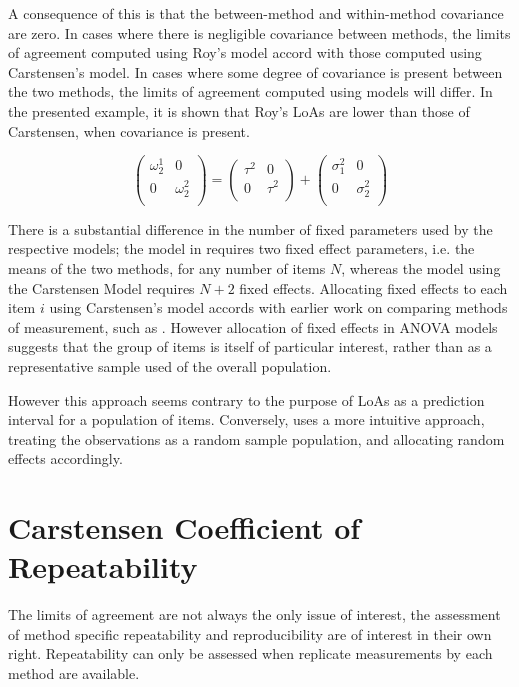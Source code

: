 \documentclass[12pt, a4paper]{report}
\theoremstyle{plain}
\theoremstyle{definition}
\theoremstyle{remark}
\begin{document}
	
	
	
	
	
	
	
	
	
	A consequence of this is that the between-method and within-method covariance are zero. In cases where there is negligible covariance between methods, the limits of agreement computed using Roy's model accord with those computed using Carstensen's model. In cases where some degree of covariance is present between the two methods, the limits of agreement computed using models will differ. In the presented example, it is shown that Roy's LoAs are lower than those of Carstensen, when covariance is present. 
	
	\[\left(\begin{array}{cc}
	\omega^1_2  & 0 \\
	0 & \omega^2_2 \\
	\end{array}  \right)
	=  \left(
	\begin{array}{cc}
	\tau^2  & 0 \\
	0 & \tau^2 \\
	\end{array} \right)+
	\left(
	\begin{array}{cc}
	\sigma^2_1  & 0 \\
	0 & \sigma^2_2 \\
	\end{array}\right)
	\]
	
	There is a substantial difference in the number of fixed parameters used by the respective models; the model in \citet{ARoy2009} requires two fixed effect parameters, i.e. the means of the two methods, for any number of items $N$, whereas the model using the Carstensen Model requires $N+2$ fixed effects. Allocating fixed effects to each item $i$ using Carstensen's model accords with earlier work on comparing methods of measurement, such as \citet{Grubbs48}. However allocation of fixed effects in ANOVA models suggests that the group of items is itself of particular interest, rather than as a representative sample used of the overall population. 
	
	However this approach seems contrary to the purpose of LoAs as a prediction interval for a population of items. Conversely, \citet{ARoy2009}
	uses a more intuitive approach, treating the observations as a random sample population, and allocating random effects accordingly.
	
	
	
	\section{Carstensen Coefficient of Repeatability}
	The limits of agreement are not always the only issue of
	interest, the assessment of method specific repeatability and
	reproducibility are of interest in their own right.
	Repeatability can only be assessed when replicate
	measurements by each method are available.
	
\end{document}

